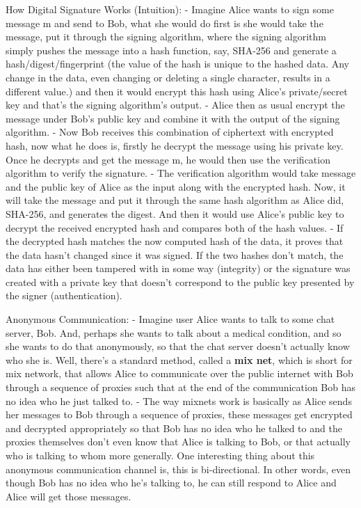 \documentclass[11pt]{article}
\begin{document}
How Digital Signature Works (Intuition): - Imagine Alice wants to sign
some message m and send to Bob, what she would do first is she would
take the message, put it through the signing algorithm, where the
signing algorithm simply pushes the message into a hash function, say,
SHA-256 and generate a hash/digest/fingerprint (the value of the hash is
unique to the hashed data. Any change in the data, even changing or
deleting a single character, results in a different value.) and then it
would encrypt this hash using Alice's private/secret key and that's the
signing algorithm's output. - Alice then as usual encrypt the message
under Bob's public key and combine it with the output of the signing
algorithm. - Now Bob receives this combination of ciphertext with
encrypted hash, now what he does is, firstly he decrypt the message
using his private key. Once he decrypts and get the message m, he would
then use the verification algorithm to verify the signature. - The
verification algorithm would take message and the public key of Alice as
the input along with the encrypted hash. Now, it will take the message
and put it through the same hash algorithm as Alice did, SHA-256, and
generates the digest. And then it would use Alice's public key to
decrypt the received encrypted hash and compares both of the hash
values. - If the decrypted hash matches the now computed hash of the
data, it proves that the data hasn't changed since it was signed. If the
two hashes don't match, the data has either been tampered with in some
way (integrity) or the signature was created with a private key that
doesn't correspond to the public key presented by the signer
(authentication).

Anonymous Communication: - Imagine user Alice wants to talk to some chat
server, Bob. And, perhaps she wants to talk about a medical condition,
and so she wants to do that anonymously, so that the chat server doesn't
actually know who she is. Well, there's a standard method, called a
\textbf{mix net}, which is short for mix network, that allows Alice to
communicate over the public internet with Bob through a sequence of
proxies such that at the end of the communication Bob has no idea who he
just talked to. - The way mixnets work is basically as Alice sends her
messages to Bob through a sequence of proxies, these messages get
encrypted and decrypted appropriately so that Bob has no idea who he
talked to and the proxies themselves don't even know that Alice is
talking to Bob, or that actually who is talking to whom more generally.
One interesting thing about this anonymous communication channel is,
this is bi-directional. In other words, even though Bob has no idea who
he's talking to, he can still respond to Alice and Alice will get those
messages.
\end{document}
